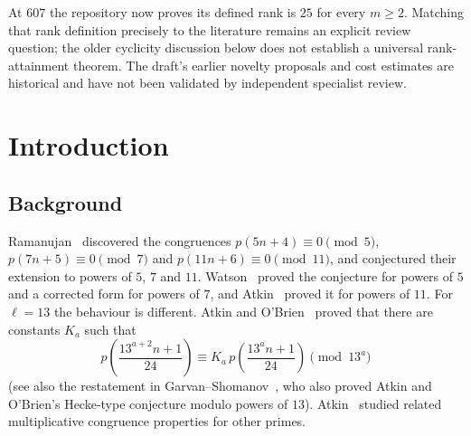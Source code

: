 \documentclass[11pt]{amsart}
\theoremstyle{plain}
\theoremstyle{definition}
\numberwithin{equation}{section}
\begin{document}
At $607$ the repository now proves its defined rank is $25$ for every
$m\ge2$. Matching that rank definition precisely to the literature remains
an explicit review question; the older cyclicity discussion below does not
establish a universal rank-attainment theorem. The draft's earlier
novelty proposals and cost estimates are historical and have not been
validated by independent specialist review.

\setcounter{tocdepth}{1}
\tableofcontents

\section{Introduction}\label{sec:intro}

\subsection{Background}
Ramanujan~\cite{Ramanujan1919} discovered the congruences $p(5n+4)\equiv0\pmod5$, $p(7n+5)\equiv0\pmod7$ and
$p(11n+6)\equiv 0\pmod{11}$, and conjectured their extension to powers of $5$, $7$ and $11$. Watson~\cite{Watson1938}
proved the conjecture for powers of $5$ and a corrected form for powers of $7$, and Atkin~\cite{Atkin1967} proved it for
powers of $11$. For $\ell=13$ the behaviour is different. Atkin and O'Brien~\cite{AtkinOBrien1967} proved that there are
constants $K_a$ such that
\begin{equation}\label{eq:AO}
  p\!\left(\frac{13^{a+2}n+1}{24}\right)\equiv K_a\, p\!\left(\frac{13^{a}n+1}{24}\right)\pmod{13^{a}}
\end{equation}
(see also the restatement in Garvan--Shomanov~\cite[Thm.~1.1]{GarvanShomanov2025}, who also proved Atkin and O'Brien's
Hecke-type conjecture modulo powers of $13$). Atkin~\cite{Atkin1968} studied related multiplicative congruence properties
for other primes.
\end{document}
